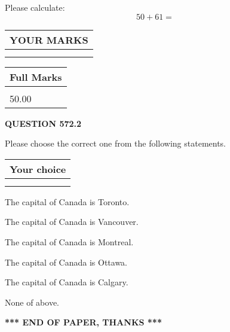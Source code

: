 \documentclass[12pt]{article}
\begin{document}
  
 
Please calculate:
\begin{equation}
50 +  %
61 = \nonumber
\end{equation}
 

 

 
  
\vspace{0.2in}
  
\noindent\begin{tabular}{|l|}
\hline
 YOUR MARKS  \\
\hline
 \\ 
 \\ 
\hline
\end{tabular}
\hspace{0.05in} \begin{tabular}{|l|}
\hline
 Full Marks  \\
\hline
 \\ 
50.00 \\
\hline
\end{tabular}
{\textbf{\Large{QUESTION
572.2 
}}}
  
  
Please choose the correct one from the following statements.
  
  
\noindent\hspace{3.0in} \begin{tabular}{|l|}
\hline
Your choice \\
\hline
 \\ 
 \\ 
\hline
\end{tabular}
  
  
 
 
The capital of Canada is Toronto.
 
 
The capital of Canada is Vancouver.
 
 
The capital of Canada is Montreal.
 
 
The capital of Canada is Ottawa.
 
 
The capital of Canada is Calgary.
 
 
 None of above.
 
 
   
   
 \vspace{0.2in}
 
   
   
   
   
\vspace{1.0in} 
{\textbf{\large{ *** END OF PAPER, THANKS *** }}} 
   
\end{document}
